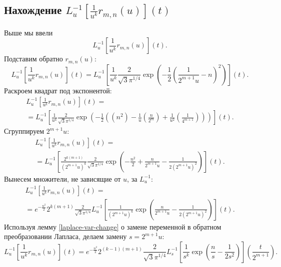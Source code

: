 \documentclass[../../paper.tex]{subfiles}
\begin{document}
\subsection{Нахождение $L^{-1}_u [\frac{1}{u^k} r_{m,n}(u)](t)$}
Выше мы ввели
\[
    L^{-1}_u \left[ \frac{1}{u^k} r_{m,n}(u) \right](t)
.\]
Подставим обратно $r_{m,n}(u)$:
\[
    L^{-1}_u \left[ \frac{1}{u^k} r_{m,n}(u) \right](t) =
%
    L^{-1}_u \left[ \frac{1}{u^k} \frac{2}{\sqrt{3} \pi^{1/4} } 
    \exp \left( -\frac{1}{2} \left( \frac{1}{2^{m+1}u} - n \right)^2  \right)
    \right](t)
.\]
Раскроем квадрат под экспонентой:
\begin{multline*}
    L^{-1}_u \left[ \frac{1}{u^k} r_{m,n}(u) \right](t)
=\\=%
    L^{-1}_u \left[ \frac{1}{u^k} \frac{2}{\sqrt{3} \pi^{1/4} } 
    \exp \left( -\frac{1}{2}
    \left(\left( n^2 \right) - \frac{1}{u} \left(\frac{n}{2^m}\right) + \frac{1}{u^2} \left(\frac{1}{4^{m+1}}\right)\right)
    \right)
    \right](t)
.\end{multline*}
Сгруппируем $2^{m+1}u$:
\begin{multline*}
    L^{-1}_u \left[ \frac{1}{u^k} r_{m,n}(u) \right](t)
=\\=%
    L^{-1}_u \left[ \frac{2^{k(m+1)}}{\left(2^{m+1}u\right)^k} \frac{2}{\sqrt{3} \pi^{1/4} } 
    \exp \left( -\frac{n^2}{2} + \frac{n}{2^{m+1}u} - \frac{1}{2 \left( 2^{m+1}u \right)^2 }
    \right)
    \right](t)
.\end{multline*}
Вынесем множители, не зависящие от $u$, за $L^{-1}_u$:
\begin{multline*}
    L^{-1}_u \left[ \frac{1}{u^k} r_{m,n}(u) \right](t)
=\\=
    e^{-\frac{n^2}{2}} 2^{k(m+1)} \frac{2}{\sqrt{3} \pi^{1/4}}
    L^{-1}_u \left[ \frac{1}{\left(2^{m+1}u\right)^k}
    \exp \left(\frac{n}{2^{m+1}u} - \frac{1}{2 \left( 2^{m+1}u \right)^2 }
    \right)
    \right](t)
.\end{multline*}
Используя лемму \ref{laplace-var-change} о замене переменной в обратном преобразовании Лапласа, делаем замену $s=2^{m+1}u$:
\[
    L^{-1}_u \left[ \frac{1}{u^k} r_{m,n}(u) \right](t) =
%
    e^{-\frac{n^2}{2}} 2^{(k-1)(m+1)} \frac{2}{\sqrt{3} \pi^{1/4}}
    L^{-1}_s \left[ \frac{1}{s^k}
    \exp \left(\frac{n}{s} - \frac{1}{2 s^2 }
    \right)
    \right] \left( \frac{t}{2^{m+1}} \right)
.\]
\end{document}
